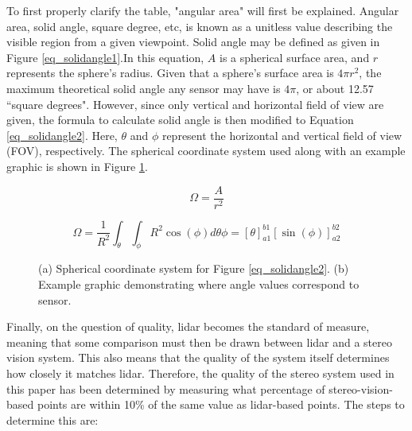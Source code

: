 To first properly clarify the table, "angular area" will first be explained. Angular area, solid angle, square degree, etc, is known as a unitless value describing the visible region from a given viewpoint. Solid angle may be defined as given in Figure \ref{eq_solidangle1}.In this equation, $A$ is a spherical surface area, and $r$ represents the sphere's radius. Given that a sphere's surface area is $4\pi r^2$, the maximum theoretical solid angle any sensor may have is $4\pi$, or about 12.57 ``square degrees". However, since only vertical and horizontal field of view are given, the formula to calculate solid angle is then modified to Equation \ref{eq_solidangle2}. Here, $\theta$ and $\phi$ represent the horizontal and vertical field of view (FOV), respectively. The spherical coordinate system used along with an example graphic is shown in Figure \ref{solidangle}.

\begin{equation}
\Omega = \frac{A}{r^2}
\label{eq_solidangle1}
\end{equation}

\begin{equation}
\Omega = \frac{1}{R^2} \int_{\theta} \int_{\phi} R^2\cos(\phi) d\theta \phi = [\theta]^{b1}_{a1} [\sin(\phi)]^{b2}_{a2}
\label{eq_solidangle2}
\end{equation}

\begin{figure}[h]
    \centering
    \caption{(a) Spherical coordinate system for Figure \ref{eq_solidangle2}. (b) Example graphic demonstrating where angle values correspond to sensor.}
    \label{solidangle}
\end{figure}


Finally, on the question of quality, lidar becomes the standard of measure, meaning that some comparison must then be drawn between lidar and a stereo vision system. This also means that the quality of the system itself determines how closely it matches lidar. Therefore, the quality of the stereo system used in this paper has been determined by measuring what percentage of stereo-vision-based points are within 10\% of the same value as lidar-based points. The steps to determine this are: 

